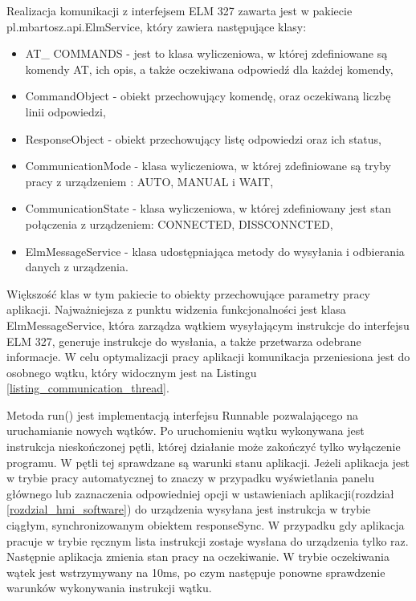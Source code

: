\documentclass[12pt]{article} %
\numberwithin{equation}{subsection}
\numberwithin{figure}{section}
\numberwithin{table}{section}
\begin{document}
	
	
	\newpage
	
	Realizacja komunikacji z interfejsem ELM 327 zawarta jest w pakiecie pl.mbartosz.api.ElmService, który zawiera następujące klasy:
	
	\begin{itemize}
		\item{AT\_ COMMANDS - jest to klasa wyliczeniowa, w której zdefiniowane są komendy AT, ich opis, a także oczekiwana odpowiedź dla każdej komendy,}
		\item{CommandObject - obiekt przechowujący komendę, oraz oczekiwaną liczbę linii odpowiedzi,}
		\item{ResponseObject - obiekt przechowujący listę odpowiedzi oraz ich status,}
		\item{CommunicationMode - klasa wyliczeniowa, w której zdefiniowane są tryby pracy z urządzeniem : AUTO, MANUAL i WAIT,}
		\item{CommunicationState - klasa wyliczeniowa, w której zdefiniowany jest stan połączenia z urządzeniem: CONNECTED, DISSCONNCTED,}
		\item{ElmMessageService - klasa udostępniająca metody do wysyłania i odbierania danych z urządzenia.}
	\end{itemize}
	
	Większość klas w tym pakiecie to obiekty przechowujące parametry pracy aplikacji. Najważniejsza z punktu widzenia funkcjonalności jest klasa ElmMessageService, która zarządza wątkiem wysyłającym instrukcje do interfejsu ELM 327, generuje instrukcje do wysłania, a także przetwarza odebrane informacje. W celu optymalizacji pracy aplikacji komunikacja przeniesiona jest do osobnego wątku, który widocznym jest na Listingu \ref{listing_communication_thread}. \\
	
	
	
	
	\newpage
	
	Metoda run() jest implementacją interfejsu Runnable pozwalającego na uruchamianie nowych wątków. Po uruchomieniu wątku wykonywana jest instrukcja nieskończonej pętli, której działanie może zakończyć tylko wyłączenie programu. W pętli tej sprawdzane są warunki stanu aplikacji. Jeżeli aplikacja jest w trybie pracy automatycznej to znaczy w przypadku wyświetlania panelu głównego lub zaznaczenia odpowiedniej opcji w ustawieniach aplikacji(rozdział \ref{rozdzial_hmi_software}) do urządzenia wysyłana jest instrukcja w trybie ciągłym, synchronizowanym obiektem responseSync. W przypadku gdy aplikacja pracuje w trybie ręcznym lista instrukcji zostaje wysłana do urządzenia tylko raz. Następnie aplikacja zmienia stan pracy na oczekiwanie. W trybie oczekiwania wątek jest wstrzymywany na 10ms, po czym następuje ponowne sprawdzenie warunków wykonywania instrukcji \mbox{wątku}. 
	
\end{document}
